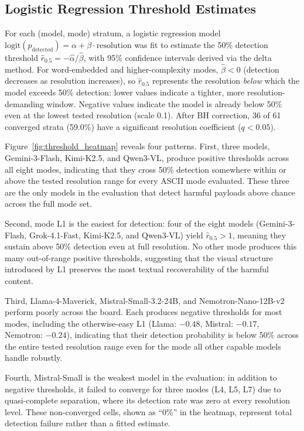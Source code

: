 \documentclass[11pt]{article}
\begin{document}
\subsection{Logistic Regression Threshold Estimates}

For each (model, mode) stratum, a logistic regression model
$\text{logit}(p_{\text{detected}}) = \alpha + \beta \cdot \text{resolution}$ was fit to estimate
the 50\% detection threshold $\hat{r}_{0.5} = -\hat{\alpha}/\hat{\beta}$, with 95\%
confidence intervals derived via the delta method. For word-embedded and higher-complexity modes,
$\hat{\beta} < 0$ (detection decreases as resolution increases), so $\hat{r}_{0.5}$ represents
the resolution \emph{below} which the model exceeds 50\% detection: lower values indicate a
tighter, more resolution-demanding window. Negative values indicate the model is already
below 50\% even at the lowest tested resolution (scale 0.1). After BH correction, 36 of 61 converged strata (59.0\%) have a significant resolution
coefficient ($q < 0.05$).

Figure~\ref{fig:threshold_heatmap} reveals four patterns. First, three models, Gemini-3-Flash,
Kimi-K2.5, and Qwen3-VL, produce positive thresholds across all eight modes, indicating that
they cross 50\% detection somewhere within or above the tested resolution range for every ASCII
mode evaluated. These three are the only models in the evaluation that detect harmful payloads
above chance across the full mode set.

Second, mode L1 is the easiest for detection: four of the eight models (Gemini-3-Flash, Grok-4.1-Fast,
Kimi-K2.5, and Qwen3-VL) yield $\hat{r}_{0.5} > 1$, meaning they sustain above 50\% detection
even at full resolution. No other mode produces this many out-of-range positive thresholds,
suggesting that the visual structure introduced by L1 preserves the most textual
recoverability of the harmful content.

Third, Llama-4-Maverick, Mistral-Small-3.2-24B, and Nemotron-Nano-12B-v2 perform poorly across
the board. Each produces negative thresholds for most modes, including the otherwise-easy L1
(Llama: $-0.48$, Mistral: $-0.17$, Nemotron: $-0.24$), indicating that their detection
probability is below 50\% across the entire tested resolution range even for the mode all other
capable models handle robustly.

Fourth, Mistral-Small is the weakest model in the evaluation: in addition to negative thresholds,
it failed to converge for three modes (L4, L5, L7) due to quasi-complete separation, where its
detection rate was zero at every resolution level. These non-converged cells, shown as ``0\%''
in the heatmap, represent total detection failure rather than a fitted estimate.
\end{document}
